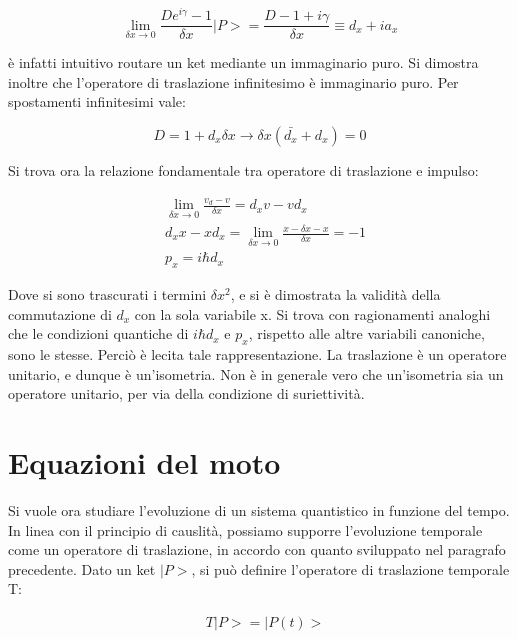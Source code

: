 \documentclass{article}
\begin{document}
\begin{equation}
    \lim_{\delta x \rightarrow 0} \frac{De^{i\gamma}-1}{\delta x}|P>= \frac{D-1+i\gamma}{\delta x}\equiv d_x+ia_x
\end{equation}

è infatti intuitivo routare un ket mediante un immaginario puro.
Si dimostra inoltre che l'operatore di traslazione infinitesimo è immaginario puro.
Per spostamenti infinitesimi vale:

\begin{equation}
    D= 1+d_x\delta x \rightarrow \delta x (\bar{d_x}+d_x)=0
\end{equation}

Si trova ora la relazione fondamentale tra operatore di traslazione e impulso:

\begin{equation}
    \begin{aligned}
         & \lim_{\delta x \rightarrow 0} \frac{v_d-v}{\delta x}= d_xv-vd_x               \\
         & d_x x- xd_x= \lim_{\delta x \rightarrow 0} \frac{x-\delta x -x}{\delta x}= -1 \\
         & p_x= i\hbar d_x
    \end{aligned}
\end{equation}

Dove si sono trascurati i termini $\delta x^2$, e si è dimostrata la validità della commutazione di $d_x$ con la sola variabile x.
Si trova con ragionamenti analoghi che le condizioni quantiche di $i\hbar d_x$ e $p_x$, rispetto alle altre variabili canoniche, sono le stesse.
Perciò è lecita tale rappresentazione.
La traslazione è un operatore unitario, e dunque è un'isometria. Non è in generale vero che un'isometria sia un operatore unitario, per via
della condizione di suriettività.


\section{Equazioni del moto}
Si vuole ora studiare l'evoluzione di un sistema quantistico in funzione del tempo.
In linea con il principio di causlità, possiamo supporre l'evoluzione temporale come un operatore di traslazione, in accordo con quanto sviluppato
nel paragrafo precedente.
Dato un  ket $|P>$, si può definire l'operatore di traslazione temporale T:

\begin{equation}
    \begin{aligned}
         & T |P>= |P(t)>
    \end{aligned}
\end{equation}
\end{document}
